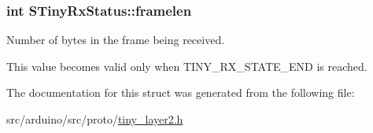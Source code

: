 \subsubsection[{framelen}]{\setlength{\rightskip}{0pt plus 5cm}int S\+Tiny\+Rx\+Status\+::framelen}\label{structSTinyRxStatus_ad9f6055b8e74f10894c48ff2247f51c4}


Number of bytes in the frame being received. 

This value becomes valid only when T\+I\+N\+Y\+\_\+\+R\+X\+\_\+\+S\+T\+A\+T\+E\+\_\+\+E\+N\+D is reached. 

The documentation for this struct was generated from the following file\+:\begin{DoxyCompactItemize}
\item 
src/arduino/src/proto/\hyperlink{src_2arduino_2src_2proto_2tiny__layer2_8h}{tiny\+\_\+layer2.\+h}\end{DoxyCompactItemize}
